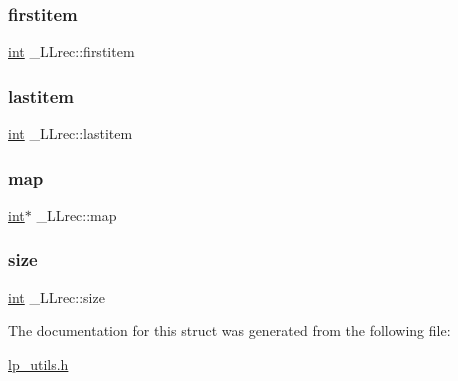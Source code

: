 \subsubsection{\texorpdfstring{firstitem}{firstitem}}
{\footnotesize\ttfamily \hyperlink{lp__lib_8h_adeb9ec6400320e4923ac9d836d509ddb}{int} \+\_\+\+L\+Lrec\+::firstitem}

\mbox{\label{struct___l_lrec_ab2476e123c4d774036cef2b87edcf56c}} 
\subsubsection{\texorpdfstring{lastitem}{lastitem}}
{\footnotesize\ttfamily \hyperlink{lp__lib_8h_adeb9ec6400320e4923ac9d836d509ddb}{int} \+\_\+\+L\+Lrec\+::lastitem}

\mbox{\label{struct___l_lrec_a11b275996a8e25f73afb7178316cdaf5}} 
\subsubsection{\texorpdfstring{map}{map}}
{\footnotesize\ttfamily \hyperlink{lp__lib_8h_adeb9ec6400320e4923ac9d836d509ddb}{int}$\ast$ \+\_\+\+L\+Lrec\+::map}

\mbox{\label{struct___l_lrec_a9dc2c36f700e9b662562b26a8d941a76}} 
\subsubsection{\texorpdfstring{size}{size}}
{\footnotesize\ttfamily \hyperlink{lp__lib_8h_adeb9ec6400320e4923ac9d836d509ddb}{int} \+\_\+\+L\+Lrec\+::size}



The documentation for this struct was generated from the following file\+:\begin{DoxyCompactItemize}
\item 
\hyperlink{lp__utils_8h}{lp\+\_\+utils.\+h}\end{DoxyCompactItemize}
